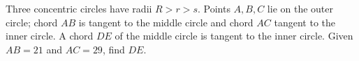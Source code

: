 Three concentric circles have radii $R>r>s$. Points $A,B,C$ lie on the outer circle; chord $AB$ is tangent to the middle circle and chord $AC$ tangent to the inner circle. A chord $DE$ of the middle circle is tangent to the inner circle. Given $AB=21$ and $AC=29$, find $DE$.
